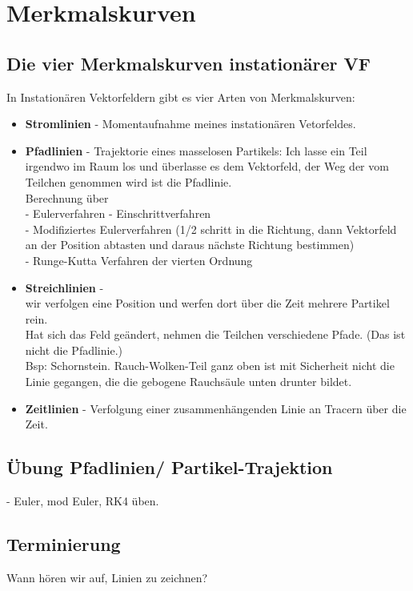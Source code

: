 \documentclass{article}
\begin{document}
\section{Merkmalskurven}
\subsection{Die vier Merkmalskurven instationärer VF}
In Instationären Vektorfeldern gibt es vier Arten von Merkmalskurven:

\begin{itemize}[noitemsep]
	\item \textbf{Stromlinien} - Momentaufnahme meines instationären Vetorfeldes.\\
	\item \textbf{Pfadlinien} -  Trajektorie eines masselosen Partikels: Ich lasse ein Teil irgendwo im Raum los und überlasse es dem Vektorfeld, der Weg der vom Teilchen genommen wird ist die Pfadlinie.\\
	Berechnung über\\
	- Eulerverfahren - Einschrittverfahren\\
	- Modifiziertes Eulerverfahren (1/2 schritt in die Richtung, dann Vektorfeld an der Position abtasten und daraus nächste Richtung bestimmen)\\
	- Runge-Kutta Verfahren der vierten Ordnung\\
	\item \textbf{Streichlinien} - \\
	wir verfolgen eine Position und werfen dort über die Zeit mehrere Partikel rein.\\
	Hat sich das Feld geändert, nehmen die Teilchen verschiedene Pfade.	(Das ist nicht die Pfadlinie.)\\
	Bsp: Schornstein. Rauch-Wolken-Teil ganz oben ist mit Sicherheit nicht die Linie gegangen, die die gebogene Rauchsäule unten drunter bildet.\\
	
	\item \textbf{Zeitlinien} - Verfolgung einer zusammenhängenden Linie an Tracern über die Zeit.
\end{itemize}


\subsection{Übung Pfadlinien/ Partikel-Trajektion}
- Euler, mod Euler, RK4 üben.\\

\subsection{Terminierung}
Wann hören wir auf, Linien zu zeichnen?\\
\end{document}

